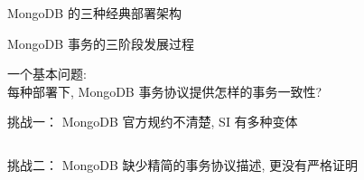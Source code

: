 
\begin{frame}{}
\end{frame}

\begin{frame}{}
  \begin{center}
    MongoDB 的三种经典部署架构
  \end{center}
\end{frame}

\begin{frame}{}
  \begin{center}
	MongoDB 事务的三阶段发展过程
  \end{center}
\end{frame}

\begin{frame}{}
  \begin{center}
	  {\large 一个基本问题:} \\[20pt]

    每种部署下, MongoDB 事务协议提供怎样的事务一致性?
	\end{center}
\end{frame}

\begin{frame}{}
  \begin{center}
	挑战一： MongoDB 官方规约不清楚, SI 有多种变体
  \end{center}

  \begin{columns}
  \end{columns}
\end{frame}

\begin{frame}{}
  \begin{center}
	挑战二： MongoDB 缺少精简的事务协议描述, 更没有严格证明
  \end{center}

\end{frame}

